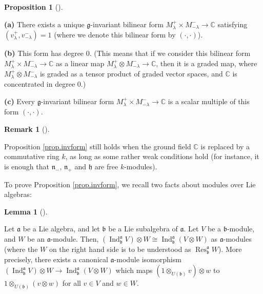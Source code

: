 \documentclass
[numbers=enddot,12pt,final,onecolumn,german,notitlepage]{scrartcl}%
\theoremstyle{definition}
\newtheorem{lem}[theo]{Lemma}
\newenvironment{lemma}[1][]
{\begin{lem}[#1]\begin{leftbar}}
{\end{leftbar}\end{lem}}
\newtheorem{prop}[theo]{Proposition}
\newenvironment{proposition}[1][]
{\begin{prop}[#1]\begin{leftbar}}
{\end{leftbar}\end{prop}}
\newtheorem{remk}[theo]{Remark}
\newenvironment{remark}[1][]
{\begin{remk}[#1]\begin{leftbar}}
{\end{leftbar}\end{remk}}
\begin{document}
\begin{proposition}
\label{prop.invform}\textbf{(a)} There exists a unique $\mathfrak{g}%
$-invariant bilinear form $M_{\lambda}^{+}\times M_{-\lambda}^{-}%
\rightarrow\mathbb{C}$ satisfying $\left(  v_{\lambda}^{+},v_{-\lambda}%
^{-}\right)  =1$ (where we denote this bilinear form by $\left(  \cdot
,\cdot\right)  $).

\textbf{(b)} This form has degree $0$. (This means that if we consider this
bilinear form $M_{\lambda}^{+}\times M_{-\lambda}^{-}\rightarrow\mathbb{C}$ as
a linear map $M_{\lambda}^{+}\otimes M_{-\lambda}^{-}\rightarrow\mathbb{C}$,
then it is a graded map, where $M_{\lambda}^{+}\otimes M_{-\lambda}^{-}$ is
graded as a tensor product of graded vector spaces, and $\mathbb{C}$ is
concentrated in degree $0$.)

\textbf{(c)} Every $\mathfrak{g}$-invariant bilinear form $M_{\lambda}%
^{+}\times M_{-\lambda}^{-}\rightarrow\mathbb{C}$ is a scalar multiple of this
form $\left(  \cdot,\cdot\right)  $.
\end{proposition}

\begin{remark}
\label{rmk.invform.1}Proposition \ref{prop.invform} still holds when the
ground field $\mathbb{C}$ is replaced by a commutative ring $k$, as long as
some rather weak conditions hold (for instance, it is enough that
$\mathfrak{n}_{-}$, $\mathfrak{n}_{+}$ and $\mathfrak{h}$ are free $k$-modules).
\end{remark}

To prove Proposition \ref{prop.invform}, we recall two facts about modules
over Lie algebras:

\begin{lemma}
\label{lem.pushpull}Let $\mathfrak{a}$ be a Lie algebra, and let
$\mathfrak{b}$ be a Lie subalgebra of $\mathfrak{a}$. Let $V$ be a
$\mathfrak{b}$-module, and $W$ be an $\mathfrak{a}$-module. Then, $\left(
\operatorname*{Ind}\nolimits_{\mathfrak{b}}^{\mathfrak{a}}V\right)  \otimes
W\cong\operatorname*{Ind}\nolimits_{\mathfrak{b}}^{\mathfrak{a}}\left(
V\otimes W\right)  $ as $\mathfrak{a}$-modules (where the $W$ on the right
hand side is to be understood as $\operatorname*{Res}\nolimits_{\mathfrak{b}%
}^{\mathfrak{a}}W$). More precisely, there exists a canonical $\mathfrak{a}%
$-module isomorphism $\left(  \operatorname*{Ind}\nolimits_{\mathfrak{b}%
}^{\mathfrak{a}}V\right)  \otimes W\rightarrow\operatorname*{Ind}%
\nolimits_{\mathfrak{b}}^{\mathfrak{a}}\left(  V\otimes W\right)  $ which maps
$\left(  1\otimes_{U\left(  \mathfrak{b}\right)  }v\right)  \otimes w$ to
$1\otimes_{U\left(  \mathfrak{b}\right)  }\left(  v\otimes w\right)  $ for all
$v\in V$ and $w\in W$.
\end{lemma}
\end{document}
